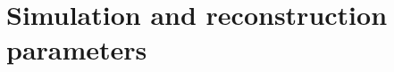 \documentclass[aps,prb,twocolumn,superscriptaddress,floatfix,nofootinbib]{revtex4-2}
\begin{document}
\clearpage
\appendix
\renewcommand{\thetable}{\thesection\arabic{table}} \renewcommand{\theHtable}{\thesection\arabic{table}} \renewcommand{\thefigure}{\thesection\arabic{figure}} \renewcommand{\theHfigure}{\thesection\arabic{figure}}
\setcounter{table}{0}
\setcounter{figure}{0}

\section{Simulation and reconstruction parameters}
\label{app:params}
\setcounter{table}{0}
\setcounter{figure}{0}
\end{document}
